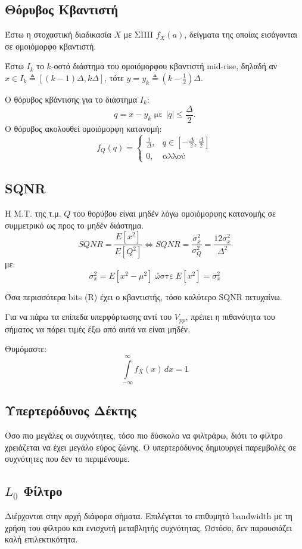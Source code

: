 \documentclass[a4paper,12pt]{article}
\begin{document}
\subsection*{Θόρυβος Κβαντιστή}
Έστω η στοχαστική διαδικασία \(X\) με ΣΠΠ \(f_X(a)\), δείγματα της οποίας εισάγονται σε ομοιόμορφο κβαντιστή.

Έστω \(I_k\) το \(k\)-οστό διάστημα του ομοιόμορφου κβαντιστή mid-rise, δηλαδή αν \(x \in I_k \triangleq [(k-1)\Delta, k\Delta]\), τότε \(y=y_k \triangleq \left(k-\frac{1}{2} \right)\Delta\).

Ο θόρυβος κβάντισης για το διάστημα \(I_k\):
\[
q=x-y_k \text{ με } |q| \leq \frac{\Delta}{2}.
\]
Ο θόρυβος ακολουθεί ομοιόμορφη κατανομή:
\[
f_Q(q) = 
\begin{cases}
\frac{1}{\Delta}, & q \in \left [-\frac{\Delta}{2}, \frac{\Delta}{2} \right] \\
0, & \text{αλλού}
\end{cases}
\]

\subsection*{SQNR}
Η Μ.Τ. της τ.μ. \(Q\) του θορύβου είναι μηδέν λόγω ομοιόμορφης κατανομής σε συμμετρικό ως προς το μηδέν διάστημα.
\[
SQNR = \frac{E[x^2]}{E[Q^2]} \iff SQNR=\frac{\sigma_x^2}{\sigma_Q^2}=\frac{12 \sigma_x^2}{\Delta^2}
\]
με:
\[
\sigma_x^2 = E[x^2 - \mu^2] \ \text{ώστε}\ E[x^2] = \sigma_x^2
\]

Όσα περισσότερα bits (R) έχει ο κβαντιστής, τόσο καλύτερο SQNR πετυχαίνω.

Για να πάρω τα επίπεδα υπερφόρτωσης αντί του \(V_{pp}\), πρέπει η πιθανότητα του σήματος να πάρει τιμές έξω από αυτά να είναι μηδέν.

Θυμόμαστε:
\[
\int\limits_{-\infty}^{\infty} f_X(x) \, dx = 1
\]

\subsection*{Υπερτερόδυνος Δέκτης}
Όσο πιο μεγάλες οι συχνότητες, τόσο πιο δύσκολο να φιλτράρω, διότι το φίλτρο χρειάζεται να έχει μεγάλο εύρος ζώνης. Ο υπερτερόδυνος δημιουργεί παρεμβολές σε συχνότητες που δεν το περιμένουμε.

\subsection*{$L_0$ Φίλτρο}
Διέρχονται στην αρχή διάφορα σήματα. Επιλέγεται το επιθυμητό bandwidth με τη χρήση του φίλτρου και ενισχυτή μεταβλητής συχνότητας. Ωστόσο, δεν παρουσιάζει καλή επιλεκτικότητα.
\end{document}
